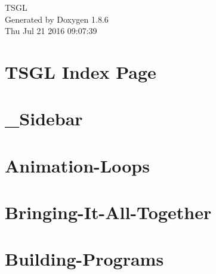 \documentclass[twoside]{book}
\newcommand{\clearemptydoublepage}{%
  \newpage{\pagestyle{empty}\cleardoublepage}%
}
\begin{document}
\hypersetup{pageanchor=false}
\begin{titlepage}
\vspace*{7cm}
\begin{center}%
{\Large T\-S\-G\-L }\\
\vspace*{1cm}
{\large Generated by Doxygen 1.8.6}\\
\vspace*{0.5cm}
{\small Thu Jul 21 2016 09:07:39}\\
\end{center}
\end{titlepage}
\clearemptydoublepage
\tableofcontents
\clearemptydoublepage
{}
\hypersetup{pageanchor=true}

\chapter{T\-S\-G\-L Index Page}
\label{index}\hypertarget{index}{}
\chapter{\-\_\-\-Sidebar}
\label{md__home_kodemonkey_workspace__t_s_g_l_docs-wiki___sidebar}
\hypertarget{md__home_kodemonkey_workspace__t_s_g_l_docs-wiki___sidebar}{}

\chapter{Animation-\/\-Loops}
\label{md__home_kodemonkey_workspace__t_s_g_l_docs-wiki__animation-_loops}
\hypertarget{md__home_kodemonkey_workspace__t_s_g_l_docs-wiki__animation-_loops}{}

\chapter{Bringing-\/\-It-\/\-All-\/\-Together}
\label{md__home_kodemonkey_workspace__t_s_g_l_docs-wiki__bringing-_it-_all-_together}
\hypertarget{md__home_kodemonkey_workspace__t_s_g_l_docs-wiki__bringing-_it-_all-_together}{}

\chapter{Building-\/\-Programs}
\label{md__home_kodemonkey_workspace__t_s_g_l_docs-wiki__building-_programs}
\hypertarget{md__home_kodemonkey_workspace__t_s_g_l_docs-wiki__building-_programs}{}

\end{document}
